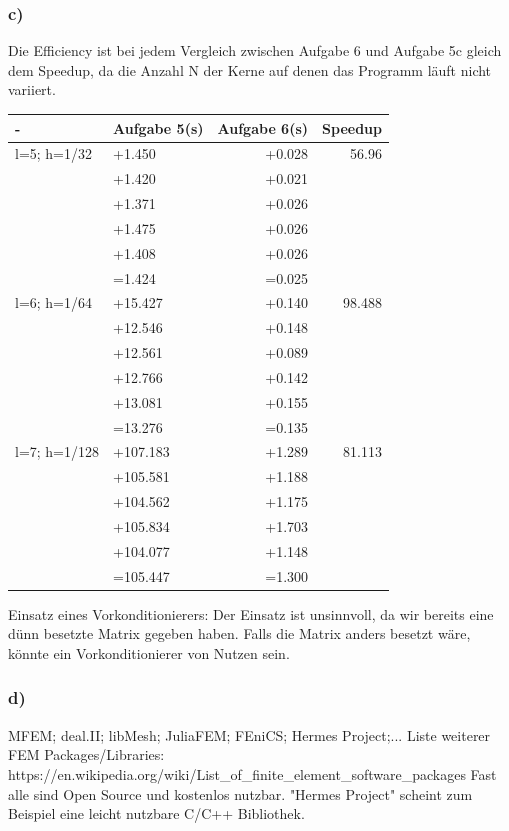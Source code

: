 \documentclass{report}
\begin{document}
	\subsubsection{c)}
Die Efficiency ist bei jedem Vergleich zwischen Aufgabe 6 und Aufgabe 5c gleich dem Speedup, da die Anzahl N der Kerne auf denen das Programm läuft nicht variiert.\newline
\begin{tabular}{|l|l|r|r|}
		\hline
		- & Aufgabe 5(s) & Aufgabe 6(s) & Speedup\\
		\hline
		l=5; h=1/32 &  +1.450 & +0.028 & 56.96 \\
		& +1.420 & +0.021 &    \\
		& +1.371 & +0.026 &    \\
		& +1.475 & +0.026 &    \\
		& +1.408 & +0.026 &   \\
		&=1.424 & =0.025  & \\
		\hline
		l=6; h=1/64 &  +15.427 & +0.140 & 98.488 \\
		& +12.546 & +0.148 &    \\
		& +12.561 & +0.089 &    \\
		& +12.766 & +0.142 &    \\
		& +13.081 & +0.155 &   \\
		&=13.276 & =0.135  & \\
		\hline
		l=7; h=1/128 &  +107.183 & +1.289 & 81.113 \\
		& +105.581 & +1.188 &    \\
		& +104.562 & +1.175 &    \\
		& +105.834 & +1.703 &    \\
		& +104.077 & +1.148 &   \\
		&=105.447 & =1.300  & \\
		\hline
	\end{tabular}
\newline
Einsatz eines Vorkonditionierers: Der Einsatz ist unsinnvoll, da wir bereits eine d\"{u}nn besetzte Matrix gegeben haben. Falls die Matrix anders besetzt wäre, könnte ein Vorkonditionierer von Nutzen sein.
	\subsubsection{d)}
MFEM; deal.II; libMesh; JuliaFEM; FEniCS; Hermes Project;...\newline
Liste weiterer FEM Packages/Libraries: https://en.wikipedia.org/wiki/List\_of\_finite\_element\_software\_packages \newline
Fast alle sind Open Source und kostenlos nutzbar. "Hermes Project" scheint zum Beispiel eine leicht nutzbare C/C++ Bibliothek.
\end{document}
